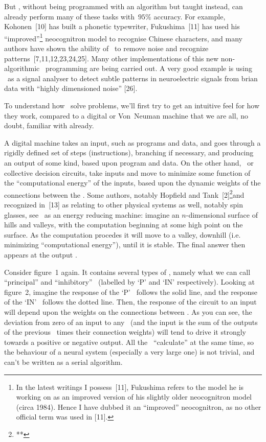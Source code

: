 But \nns, without being programmed with an algorithm but taught instead,
can already perform many of these tasks with~$95\%$ accuracy. For
example, Kohonen~[10] has built a phonetic typewriter, Fukushima~[11]
has used his ``improved''\footnote*{In the latest writings I possess~[11],
Fukushima refers to the model he is working on as an improved version of
his slightly older neocognitron model (circa 1984). Hence I have dubbed it an
``improved'' neocognitron, as no other official term was used in
[11].} 
neocognitron model to recognise Chinese characters, and many
authors have shown the ability of \nns\ to remove noise and recognize
patterns~[7,11,12,23,24,25].
Many other implementations of this new non-algorithmic \nn\ programming are
being carried out.
A very good example is using \nns\ as a signal analyser to detect
subtle patterns in neuroelectric signals from brian data with ``highly
dimensioned noise'' [26].

To understand how \nns\ solve problems, we'll first try to get an
intuitive feel for how they work, compared to a digital or Von~Neuman
machine that we are all, no doubt, familiar with already.

A digital machine takes an input, such as programs and data, and goes
through a rigidly defined set of steps (instructions), branching if
necessary, and producing an output of some kind, based upon program and
data.
On the other hand, \nns\ or collective decision circuits, take 
inputs and move to minimize
some function of the ``computational energy'' of the inputs, based upon
the dynamic weights of the connections between the \neus. 
Some authors, notably Hopfield and Tank~[2]\footnote{**}{and recognized 
in~[13] as relating to other physical systems as well, notably spin glasses},
see \nns\ as an energy
reducing machine: imagine an $n$-dimensional surface of hills and
valleys, with the computation beginning
at some high point on the surface.
As the computation procedes it will move to a valley, downhill (i.e.\ %
minimizing ``computational energy''), until it is stable.
The final answer then appears at the output \neus.

Consider figure~1 again.
It contains several types of \neus, namely what we can call
``principal'' and ``inhibitory'' \neus\ (labelled by `P' and `IN'
respectively).
Looking at figure~2, imagine the response of the `P' \neus\ follows the
solid line, and the response of the `IN' \neus\ follows the dotted line.
Then, the response of the circuit to an input will depend upon the
weights on the connections between \neus.
As you can see, the deviation from zero of an input to any 
\neu\ (and the input is
the sum of the outputs of the previous \neus\ times their connection
weights) will tend to drive it strongly towards a positive or negative
output.
All the \neus\ ``calculate'' at the same time, so the behaviour of a
neural system (especially a very large one) is not trivial, and can't be
written as a serial algorithm.

